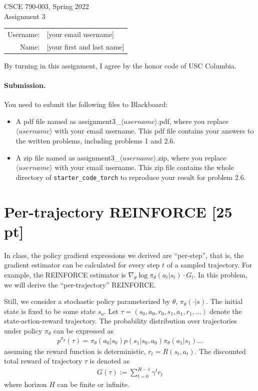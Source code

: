 \documentclass[11pt]{article}
\theoremstyle{case}
\begin{document}
\begin{center}
{\Large CSCE 790-003, Spring 2022 \\ Assignment 3}

\begin{tabular}{rl}
Username: & [your email username] \\
Name: & [your first and last name] \\
\end{tabular}
\end{center}
By turning in this assignment, I agree by the honor code of USC Columbia.

\paragraph{Submission.}
You need to submit the following files to Blackboard:
\begin{itemize}
    \item A pdf file named as assignment3\_$\langle username \rangle$.pdf, where you replace $\langle username \rangle$ with your email username. This pdf file contains your answers to the written problems, including problems 1 and 2.6.
    \item A zip file named as assignment3\_$\langle username \rangle$.zip, where you replace $\langle username \rangle$ with your email username. This zip file contains the whole directory of \texttt{starter\_code\_torch} to reproduce your result for problem 2.6.
\end{itemize}

\section{Per-trajectory REINFORCE [25 pt]}
In class, the policy gradient expressions we derived are ``per-step'', that is, the gradient estimator can be calculated for every step $t$ of a sampled trajectory. For example, the REINFORCE estimator is $\nabla_\theta \log \pi_\theta(a_t|s_t) \cdot G_t$.
In this problem, we will derive the ``per-trajectory'' REINFORCE.

Still, we consider a stochastic policy parameterized by $\theta$, $\pi_\theta(\cdot|s)$. The initial state is fixed to be some state $s_o$.
Let $\tau=(s_0, a_0, r_0, s_1, a_1, r_1,...)$ denote the state-action-reward trajectory.
The probability distribution over trajectories under policy $\pi_\theta$ can be expressed as
\begin{align*}
    p^{\pi_\theta}(\tau) = \pi_\theta(a_0|s_0)p(s_1|s_0,a_0)\pi_\theta(a_1|s_1)...
\end{align*}
assuming the reward function is deterministic, $r_t = R(s_t, a_t)$.
The discounted total reward of trajectory $\tau$ is denoted as
\begin{align*}
    G(\tau) := \sum_{t=0}^{H-1} \gamma^t r_t
\end{align*}
where horizon $H$ can be finite or infinite.
\end{document}
